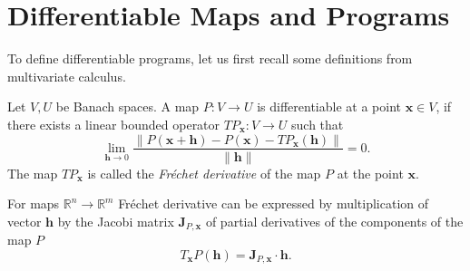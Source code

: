 \documentclass[11pt]{article}
\newcommand{\RR}{\mathbb{R}}
\newcommand{\x}{\mathbf{x}}
\newcommand{\h}{\mathbf{h}}
\begin{document}
\section{Differentiable Maps and Programs}
To define differentiable programs, let us first recall some
definitions from multivariate calculus.
\begin{definition}[Derivative]
  Let $V,U$ be Banach spaces. A map $P:V\to U$ is differentiable at a point
  $\x\in V$, if there exists a linear bounded operator $TP_\x:V\to U$ such that
  \begin{equation}
    \label{eq:frechet}
    \lim_{\h\to 0}\frac{\|P(\x+\h)-P(\x)-TP_\x(\h)\|}{\|\h\|} = 0.
  \end{equation}
  The map $TP_\x$ is called the \emph{Fréchet derivative} of the map $P$ at the
  point $\x$.
\end{definition}
For maps $\RR^n\to \RR^m$ Fréchet derivative can be expressed by multiplication
of vector $\h$ by the Jacobi matrix $\mathbf{J}_{P,\x}$ of partial
derivatives of the components of the map $P$
\begin{equation*}
  T_\x P(\h) = \mathbf{J}_{P,\x}\cdot \h.
\end{equation*}
\end{document}
